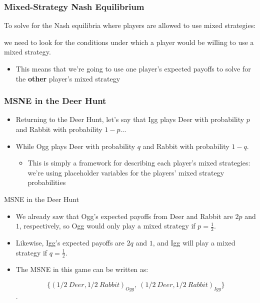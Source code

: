 \begin{frame}
\frametitle{Mixed-Strategy Nash Equilibrium}
	To solve for the Nash equilibria where players are allowed to use mixed strategies:

  we need to look for the conditions under which a player would be willing to use a mixed strategy.

\begin{itemize}

	\item This means that we're going to use one player's expected payoffs to solve for the \textbf{other} player's mixed strategy

\end{itemize}
\end{frame}

\begin{frame}
\frametitle{MSNE in the Deer Hunt}
\begin{itemize}
	\item Returning to the Deer Hunt, let's say that Igg plays Deer with probability $p$ and Rabbit with probability $1 - p$...
	\item While Ogg plays Deer with probability $q$ and Rabbit with probability $1 - q$.
	\begin{itemize}
		\item This is simply a framework for describing each player's mixed strategies:
    we're using placeholder variables for the players' mixed strategy probabilities
	\end{itemize}
\end{itemize}
\end{frame}

\begin{frame}{MSNE in the Deer Hunt}
  \begin{itemize}
	\item We already saw that Ogg's expected payoffs from Deer and Rabbit are $2p$ and $1$, respectively, 
    so Ogg would only play a mixed strategy if $p = \frac{1}{2}$.

	\item Likewise, Igg's expected payoffs are $2q$ and $1$, and Igg will play a mixed strategy if $q = \frac{1}{2}$.

	\item The MSNE in this game can be written as:

    $$ \{(1/2~Deer, 1/2~Rabbit)_{Ogg}, \ (1/2~Deer, 1/2~Rabbit)_{Igg}\}$$.

\end{itemize}
\end{frame}

